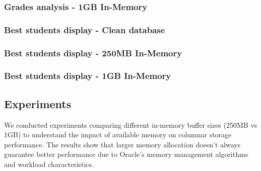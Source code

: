 \clearpage
\begin{multicols}{2}

    \subsubsection{Grades analysis - 1GB In-Memory}
    \vfill\null
    \columnbreak

    \subsubsection{Best students display - Clean database}
    \vfill\null
\end{multicols}

\clearpage
\begin{multicols}{2}

    \subsubsection{Best students display - 250MB In-Memory}
    \vfill\null
    \columnbreak

    \subsubsection{Best students display - 1GB In-Memory}
    \vfill\null
\end{multicols}

\subsection{Experiments}
We conducted experiments comparing different in-memory buffer sizes (250MB vs 1GB) to understand the impact of available memory on columnar storage performance. The results show that larger memory allocation doesn't always guarantee better performance due to Oracle's memory management algorithms and workload characteristics.

